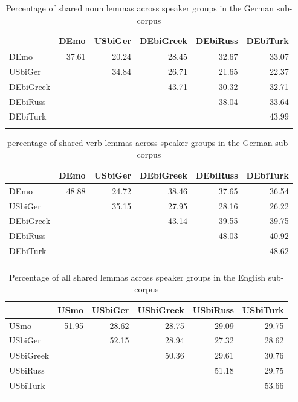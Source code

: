 \documentclass[output=paper,colorlinks,citecolor=brown]{langscibook}
\begin{document}
\begin{table}
\caption{Percentage of shared noun lemmas across speaker groups in the German sub-corpus}
\centering
\begin{tabularx}{\textwidth}{Qrrrrr}
\lsptoprule
~ & DEmo & USbiGer & DEbiGreek & DEbiRuss & DEbiTurk\\\midrule
DEmo &  37.61 & 20.24 & 28.45 & 32.67 & 33.07\\
USbiGer & ~ &  34.84 & 26.71 & 21.65 & 22.37\\
DEbiGreek & ~ & ~ &  43.71 & 30.32 & 32.71\\
DEbiRuss & ~ & ~ & ~ &  38.04 & 33.64\\
DEbiTurk & ~ & ~ & ~ & ~ &  43.99 \\
\lspbottomrule
\end{tabularx}
\label{tab:kelleretal:NOUN_Kable_TriangleMatrix_DE}
\end{table}

\begin{table}
\caption{percentage of shared verb lemmas across speaker groups in the German sub-corpus}
\centering
\begin{tabularx}{\textwidth}{Qrrrrr}
\lsptoprule
~ & DEmo & USbiGer & DEbiGreek & DEbiRuss & DEbiTurk\\\midrule
DEmo &  48.88 & 24.72 & 38.46 & 37.65 & 36.54\\
USbiGer & ~ &  35.15 & 27.95 & 28.16 & 26.22\\
DEbiGreek & ~ & ~ &  43.14 & 39.55 & 39.75\\
DEbiRuss & ~ & ~ & ~ &  48.03 & 40.92\\
DEbiTurk & ~ & ~ & ~ & ~ &  48.62 \\
\lspbottomrule
\end{tabularx}
\label{tab:kelleretal:VERB_Kable_TriangleMatrix_DE}
\end{table}

\begin{table}
\centering
\caption{Percentage of all shared lemmas across speaker groups in the English sub-corpus}
\begin{tabularx}{\textwidth}{Qrrrrr}
\lsptoprule
~ & USmo & USbiGer & USbiGreek & USbiRuss & USbiTurk\\\midrule
USmo &  51.95 & 28.62 & 28.75 & 29.09 & 29.75\\
USbiGer & ~ &  52.15 & 28.94 & 27.32 & 28.62\\
USbiGreek & ~ & ~ &  50.36 & 29.61 & 30.76\\
USbiRuss & ~ & ~ & ~ &  51.18 & 29.75\\
USbiTurk & ~ & ~ & ~ & ~ &  53.66 \\
\lspbottomrule
\end{tabularx}
\label{tab:kelleretal:all_Kable_TriangleMatrix_EN}
\end{table}
\end{document}
